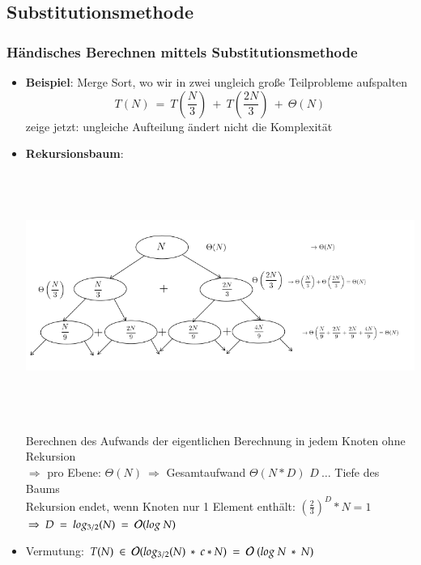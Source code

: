     \subsection{Substitutionsmethode}
    \subsubsection*{Händisches Berechnen mittels Substitutionsmethode}
    \begin{itemize}
        \item \textbf{Beispiel}: Merge Sort, wo wir in zwei ungleich große Teilprobleme aufspalten \\
        \[ T(N)\ =\ T\left(\frac{N}{3}\right)\ +\ T\left(\frac{2N}{3}\right)\ +\ \Theta(N)\]
        zeige jetzt: ungleiche Aufteilung ändert nicht die Komplexität
        \item \textbf{Rekursionsbaum}:\\
        \begin{center}
        \includegraphics[width=15cm,height=8cm,keepaspectratio]{./Pictures/Substitutionsmethode.png}
        \end{center}
        Berechnen des Aufwands der eigentlichen Berechnung in jedem Knoten ohne Rekursion\\
        $\Rightarrow$ pro Ebene: $\Theta(N) \ \Rightarrow$ Gesamtaufwand $\Theta(N*D)$ $D\ \dots$ Tiefe des Baums \\
        Rekursion endet, wenn Knoten nur 1 Element enthält: $\left(\frac{2}{3}\right)^D * N = 1$\\
        \hspace*{1cm} $\Rightarrow\ D\ =\ log_{3/2}(N)\ = \ \bigO{}(log\ N)$
        \item Vermutung: $T(N)\ \in\ \bigO{}(log_{3/2}(N)\ *\ c*N)\ =\ \bigO{}\ (log\ N\ *\ N)$\\

\end{itemize}
